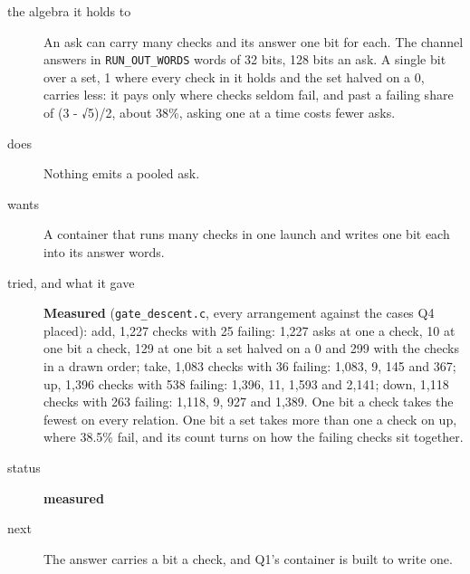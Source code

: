 \begin{description}
\item[{the algebra it holds to}] An ask can carry many checks and its answer one bit for each. The channel answers in \texttt{RUN\_\allowbreak{}OUT\_\allowbreak{}WORDS} words of 32 bits, 128 bits an ask. A single bit over a set, 1 where every check in it holds and the set halved on a 0, carries less: it pays only where checks seldom fail, and past a failing share of (3 - √5)/2, about 38\%, asking one at a time costs fewer asks.
\item[{does}] Nothing emits a pooled ask.
\item[{wants}] A container that runs many checks in one launch and writes one bit each into its answer words.
\item[{tried, and what it gave}] \textbf{Measured} (\texttt{gate\_\allowbreak{}descent.\allowbreak{}c}, every arrangement against the cases Q4 placed): add, 1,227 checks with 25 failing: 1,227 asks at one a check, 10 at one bit a check, 129 at one bit a set halved on a 0 and 299 with the checks in a drawn order; take, 1,083 checks with 36 failing: 1,083, 9, 145 and 367; up, 1,396 checks with 538 failing: 1,396, 11, 1,593 and 2,141; down, 1,118 checks with 263 failing: 1,118, 9, 927 and 1,389. One bit a check takes the fewest on every relation. One bit a set takes more than one a check on up, where 38.5\% fail, and its count turns on how the failing checks sit together.
\item[{status}] \textbf{measured}
\item[{next}] The answer carries a bit a check, and Q1's container is built to write one.
\end{description}

